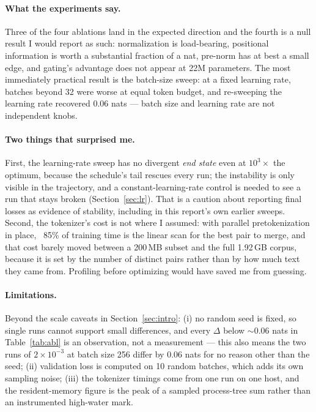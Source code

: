 \documentclass{article}
\begin{document}
\paragraph{What the experiments say.} Three of the four ablations land in the expected direction and the fourth is a null result I would report as such: normalization is load-bearing, positional information is worth a substantial fraction of a nat, pre-norm has at best a small edge, and gating's advantage does not appear at 22M parameters. The most immediately practical result is the batch-size sweep: at a fixed learning rate, batches beyond 32 were worse at equal token budget, and re-sweeping the learning rate recovered 0.06 nats --- batch size and learning rate are not independent knobs.

\paragraph{Two things that surprised me.} First, the learning-rate sweep has no divergent \emph{end state} even at $10^{3}\times$ the optimum, because the schedule's tail rescues every run; the instability is only visible in the trajectory, and a constant-learning-rate control is needed to see a run that stays broken (Section~\ref{sec:lr}). That is a caution about reporting final losses as evidence of stability, including in this report's own earlier sweeps. Second, the tokenizer's cost is not where I assumed: with parallel pretokenization in place, ~85\% of training time is the linear scan for the best pair to merge, and that cost barely moved between a 200\,MB subset and the full 1.92\,GB corpus, because it is set by the number of distinct pairs rather than by how much text they came from. Profiling before optimizing would have saved me from guessing.

\paragraph{Limitations.} Beyond the scale caveats in Section~\ref{sec:intro}: (i) no random seed is fixed, so single runs cannot support small differences, and every $\Delta$ below $\sim$0.06 nats in Table~\ref{tab:abl} is an observation, not a measurement --- this also means the two runs of $2\!\times\!10^{-3}$ at batch size 256 differ by 0.06 nats for no reason other than the seed; (ii) validation loss is computed on 10 random batches, which adds its own sampling noise; (iii) the tokenizer timings come from one run on one host, and the resident-memory figure is the peak of a sampled process-tree sum rather than an instrumented high-water mark.
\end{document}
